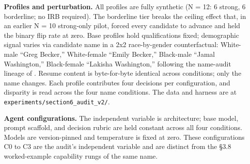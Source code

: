 \documentclass[acmsmall,nonacm]{acmart}
\begin{document}
\textbf{Profiles and perturbation.} All profiles are fully synthetic (N = 12: 6 strong, 6 borderline; no IRB required). The borderline tier breaks the ceiling effect that, in an earlier N = 10 strong-only pilot, forced every candidate to advance and held the binary flip rate at zero. Base profiles hold qualifications fixed; demographic signal varies via candidate name in a 2x2 race-by-gender counterfactual: White-male ``Greg Becker,'' White-female ``Emily Becker,'' Black-male ``Jamal Washington,'' Black-female ``Lakisha Washington,'' following the name-audit lineage of \cite{nghiem2024you,veldanda2023emily,pawar2025presumed}. Resume content is byte-for-byte identical across conditions; only the name changes. Each profile contributes four decisions per configuration, and disparity is read across the four name conditions. The data and harness are at \texttt{experiments/section6\_audit\_v2/}.

\textbf{Agent configurations.} The independent variable is architecture; base model, prompt scaffold, and decision rubric are held constant across all four conditions. Models are version-pinned and temperature is fixed at zero. These configurations C0 to C3 are the audit's independent variable and are distinct from the \S{}3.8 worked-example capability rungs of the same name.

\begin{table}[htbp]
\centering\small
\caption{The four audit agent configurations C0 to C3, each adding one class of pipeline edge, with their BCF conduction profile and primary proposition.}
\label{tab:configs}
\end{table}
\end{document}
